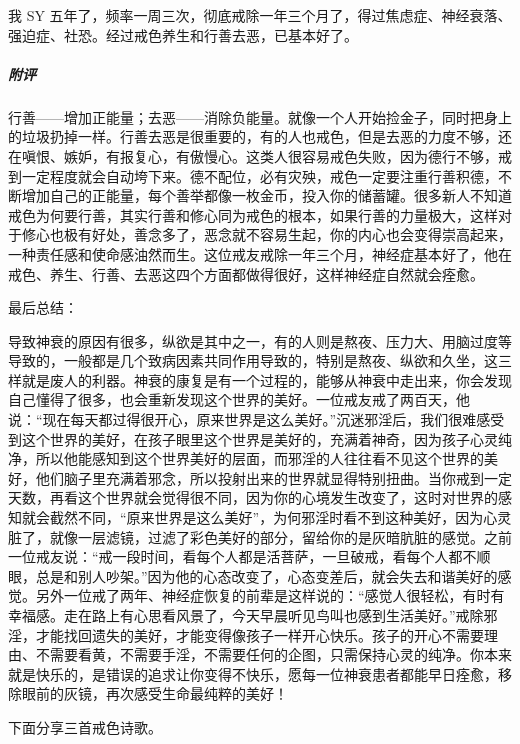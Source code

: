 \begin{case}[神经衰弱]
    我 SY 五年了，频率一周三次，彻底戒除一年三个月了，得过焦虑症、神经衰落、强迫症、社恐。经过戒色养生和行善去恶，已基本好了。
    \subparagraph{附评} 行善——增加正能量；去恶——消除负能量。就像一个人开始捡金子，同时把身上的垃圾扔掉一样。行善去恶是很重要的，有的人也戒色，但是去恶的力度不够，还在嗔恨、嫉妒，有报复心，有傲慢心。这类人很容易戒色失败，因为德行不够，戒到一定程度就会自动垮下来。德不配位，必有灾殃，戒色一定要注重行善积德，不断增加自己的正能量，每个善举都像一枚金币，投入你的储蓄罐。很多新人不知道戒色为何要行善，其实行善和修心同为戒色的根本，如果行善的力量极大，这样对于修心也极有好处，善念多了，恶念就不容易生起，你的内心也会变得崇高起来，一种责任感和使命感油然而生。这位戒友戒除一年三个月，神经症基本好了，他在戒色、养生、行善、去恶这四个方面都做得很好，这样神经症自然就会痊愈。
\end{case}

最后总结：

导致神衰的原因有很多，纵欲是其中之一，有的人则是熬夜、压力大、用脑过度等导致的，一般都是几个致病因素共同作用导致的，特别是熬夜、纵欲和久坐，这三样就是废人的利器。神衰的康复是有一个过程的，能够从神衰中走出来，你会发现自己懂得了很多，也会重新发现这个世界的美好。一位戒友戒了两百天，他说：“现在每天都过得很开心，原来世界是这么美好。”沉迷邪淫后，我们很难感受到这个世界的美好，在孩子眼里这个世界是美好的，充满着神奇，因为孩子心灵纯净，所以他能感知到这个世界美好的层面，而邪淫的人往往看不见这个世界的美好，他们脑子里充满着邪念，所以投射出来的世界就显得特别扭曲。当你戒到一定天数，再看这个世界就会觉得很不同，因为你的心境发生改变了，这时对世界的感知就会截然不同，“原来世界是这么美好”，为何邪淫时看不到这种美好，因为心灵脏了，就像一层滤镜，过滤了彩色美好的部分，留给你的是灰暗肮脏的感觉。之前一位戒友说：“戒一段时间，看每个人都是活菩萨，一旦破戒，看每个人都不顺眼，总是和别人吵架。”因为他的心态改变了，心态变差后，就会失去和谐美好的感觉。另外一位戒了两年、神经症恢复的前辈是这样说的：“感觉人很轻松，有时有幸福感。走在路上有心思看风景了，今天早晨听见鸟叫也感到生活美好。”戒除邪淫，才能找回遗失的美好，才能变得像孩子一样开心快乐。孩子的开心不需要理由、不需要看黄，不需要手淫，不需要任何的企图，只需保持心灵的纯净。你本来就是快乐的，是错误的追求让你变得不快乐，愿每一位神衰患者都能早日痊愈，移除眼前的灰镜，再次感受生命最纯粹的美好！

下面分享三首戒色诗歌。

